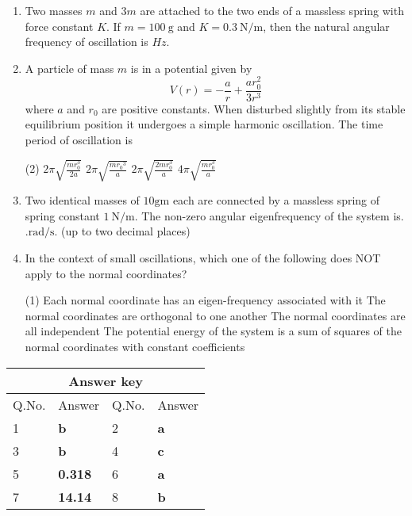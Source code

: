 \begin{enumerate}
	\item Two masses $m$ and $3 m$ are attached to the two ends of a massless spring with force constant $K$. If $m=100 \mathrm{~g}$ and $K=0.3 \mathrm{~N} / \mathrm{m}$, then the natural angular frequency of oscillation is $H z$.
{	}

	\item A particle of mass $m$ is in a potential given by
	$$
	V(r)=-\frac{a}{r}+\frac{a r_{0}^{2}}{3 r^{3}}
	$$
	where $a$ and $r_{0}$ are positive constants. When disturbed slightly from its stable equilibrium position it undergoes a simple harmonic oscillation. The time period of oscillation is
	{}
\begin{tasks}(2)
	\task[\textbf{A.}] $2 \pi \sqrt{\frac{m r_{0}^{3}}{2 a}}$
	\task[\textbf{B.}]$2 \pi \sqrt{\frac{m r_{0}{ }^{3}}{a}}$
	\task[\textbf{C.}]$2 \pi \sqrt{\frac{2 m r_{0}^{3}}{a}}$
	\task[\textbf{D.}]$4 \pi \sqrt{\frac{m r_{0}^{3}}{a}}$
\end{tasks}

	\item Two identical masses of $10 \mathrm{gm}$ each are connected by a massless spring of spring constant $1 \mathrm{~N} / \mathrm{m}$. The non-zero angular eigenfrequency of the system is. $. \mathrm{rad} / \mathrm{s} .$ (up to two decimal places)
{	}
	\item In the context of small oscillations, which one of the following does NOT apply to the normal coordinates?
	{}
\begin{tasks}(1)
	\task[\textbf{A.}] Each normal coordinate has an eigen-frequency associated with it
	\task[\textbf{B.}]The normal coordinates are orthogonal to one another
	\task[\textbf{C.}]The normal coordinates are all independent
	\task[\textbf{D.}]The potential energy of the system is a sum of squares of the normal coordinates with constant coefficients
\end{tasks}
\end{enumerate}
\setlength\arrayrulewidth{1pt}
\begin{table}[H]
	\centering
	
	\begin{tabular}{|p{1.5cm}|p{1.5cm}||p{1.5cm}|p{1.5cm}|}
		\hline
		\multicolumn{4}{|c|}{\textbf{Answer key}}\\\hline\hline
		\rowcolor{ocrel}Q.No.&Answer&Q.No.&Answer\\\hline
		1&\textbf{b}&2&\textbf{a}\\\hline
		3&\textbf{b}&4&\textbf{c}\\\hline
		5&\textbf{0.318}&6&\textbf{a}\\\hline
		7&\textbf{14.14}&8&\textbf{b}\\\hline
	\end{tabular}
\end{table}
